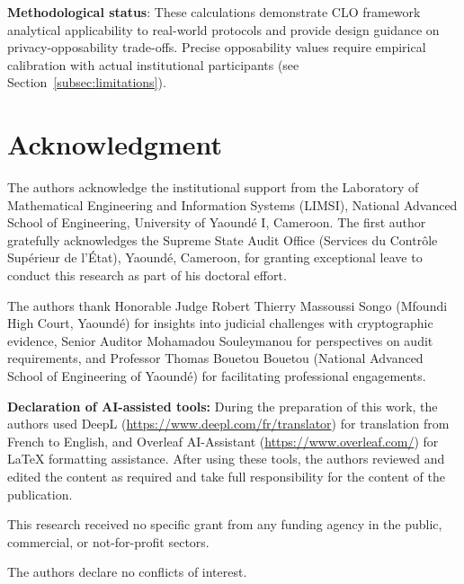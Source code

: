 \documentclass{ieeeaccess}
\begin{document}
\textbf{Methodological status}: These calculations demonstrate CLO framework analytical applicability to real-world protocols and provide design guidance on privacy-opposability trade-offs. Precise opposability values require empirical calibration with actual institutional participants 
(see Section~\ref{subsec:limitations}).

\section*{Acknowledgment}

The authors acknowledge the institutional support from the Laboratory of Mathematical Engineering and Information Systems (LIMSI), National Advanced School of Engineering, University of Yaoundé I, Cameroon. 
The first author gratefully acknowledges the Supreme State Audit Office (Services du Contrôle Supérieur de l'État), Yaoundé, Cameroon, for granting exceptional leave to conduct this research as part of his doctoral effort.

The authors thank Honorable Judge Robert Thierry Massoussi Songo (Mfoundi High Court, Yaoundé) for insights into judicial challenges 
with cryptographic evidence, Senior Auditor Mohamadou Souleymanou for perspectives on audit requirements, and Professor Thomas Bouetou Bouetou (National Advanced School of Engineering of Yaoundé) for facilitating professional engagements.

\textbf{Declaration of AI-assisted tools:} During the preparation of this work, the authors used DeepL (\url{https://www.deepl.com/fr/translator}) for translation from French to English, and Overleaf AI-Assistant 
(\url{https://www.overleaf.com/}) for LaTeX formatting assistance. After using these tools, the authors reviewed and edited the content as required and take full responsibility for the content of the publication.

This research received no specific grant from any funding agency in the public, commercial, or not-for-profit sectors.

The authors declare no conflicts of interest.
\end{document}
